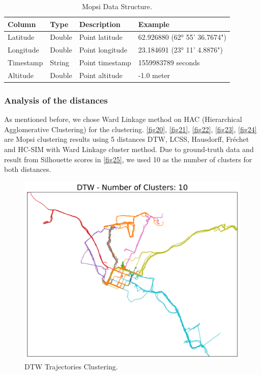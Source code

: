 \documentclass[a4paper, 12pt]{article}
\begin{document}
\begin{table}[htbp!]
    \centering
    \def\arraystretch{3}%
    \caption{Mopsi Data Structure.}
    \begin{tabular}{||l l l l||} 
     \hline
     \textbf{Column} & \textbf{Type} & \textbf{Description} & \textbf{Example} \\ [0.5ex] 
     \hline\hline
     Latitude & Double & Point latitude & 62.926880 (62° 55' 36.7674") \\ 
     Longitude & Double & Point longitude & 23.184691 (23° 11' 4.8876") \\
     Timestamp & String & Point timestamp & 1559983789 seconds \\
     Altitude & Double & Point altitude & -1.0 meter \\ [1ex] 
     \hline
    \end{tabular}
    \label{table:3}
\end{table}

\pagebreak

\subsubsection{Analysis of the distances}

As mentioned before, we chose Ward Linkage method on HAC (Hierarchical Agglomerative Clustering) for the clustering. \autoref{fig20}, \ref{fig21}, \ref{fig22}, \ref{fig23}, \ref{fig24} are Mopsi clustering results using 5 distances DTW, LCSS, Hausdorff, Fréchet and HC-SIM with Ward Linkage cluster method. Due to ground-truth data and result from Silhouette scores in \autoref{fig25}, we used 10 as the number of clusters for both distances.

\begin{figure}[htbp!]
    \centering
    \includegraphics[width=1\textwidth]{dtw_trajectory_clustering.png}
    \caption{DTW Trajectories Clustering.}
    \label{fig20}
\end{figure}
\end{document}
